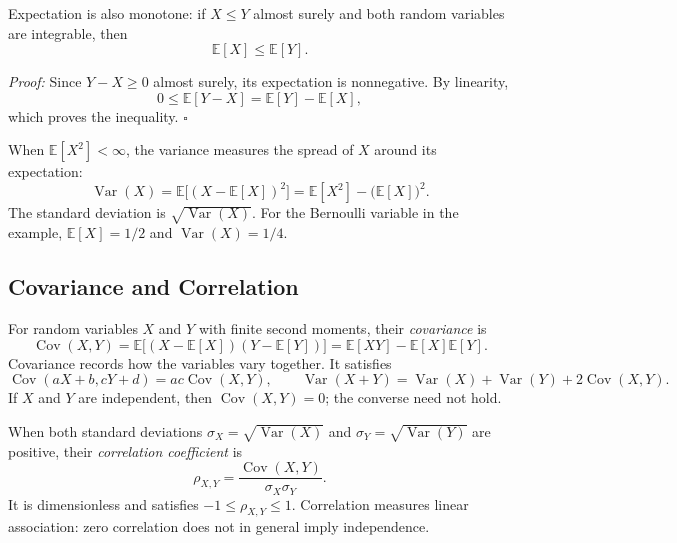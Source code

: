 \documentclass[a4paper,11pt,abstracton]{scrartcl}
\theoremstyle{dotlessP}
\theoremstyle{dotlessS}
\theoremstyle{remark}
\theoremstyle{definition}
\begin{document}
\begin{problem_box}
Expectation is also monotone: if $X\leq Y$ almost surely and both random variables are integrable, then
\[
  \mathbb{E}[X]\leq\mathbb{E}[Y].
\]
\end{problem_box}

\begin{claim_box}
\textit{Proof:}
Since $Y-X\geq0$ almost surely, its expectation is nonnegative. By linearity,
\[
  0\leq\mathbb{E}[Y-X]=\mathbb{E}[Y]-\mathbb{E}[X],
\]
which proves the inequality.
\hfill$\square$
\end{claim_box}

When $\mathbb{E}[X^2]<\infty$, the variance measures the spread of $X$ around its expectation:
\[
  \operatorname{Var}(X)
  =\mathbb{E}\bigl[(X-\mathbb{E}[X])^2\bigr]
  =\mathbb{E}[X^2]-\bigl(\mathbb{E}[X]\bigr)^2.
\]
The standard deviation is $\sqrt{\operatorname{Var}(X)}$. For the Bernoulli variable in the example, $\mathbb{E}[X]=1/2$ and $\operatorname{Var}(X)=1/4$.
\subsection{Covariance and Correlation}

For random variables $X$ and $Y$ with finite second moments, their \emph{covariance} is
\[
  \operatorname{Cov}(X,Y)
  =\mathbb{E}\bigl[(X-\mathbb{E}[X])(Y-\mathbb{E}[Y])\bigr]
  =\mathbb{E}[XY]-\mathbb{E}[X]\mathbb{E}[Y].
\]
Covariance records how the variables vary together. It satisfies
\[
  \operatorname{Cov}(aX+b,cY+d)=ac\operatorname{Cov}(X,Y),
  \qquad
  \operatorname{Var}(X+Y)=\operatorname{Var}(X)+\operatorname{Var}(Y)+2\operatorname{Cov}(X,Y).
\]
If $X$ and $Y$ are independent, then $\operatorname{Cov}(X,Y)=0$; the converse need not hold.

When both standard deviations $\sigma_X=\sqrt{\operatorname{Var}(X)}$ and $\sigma_Y=\sqrt{\operatorname{Var}(Y)}$ are positive, their \emph{correlation coefficient} is
\[
  \rho_{X,Y}=\frac{\operatorname{Cov}(X,Y)}{\sigma_X\sigma_Y}.
\]
It is dimensionless and satisfies $-1\leq\rho_{X,Y}\leq1$. Correlation measures linear association: zero correlation does not in general imply independence.
\end{document}
